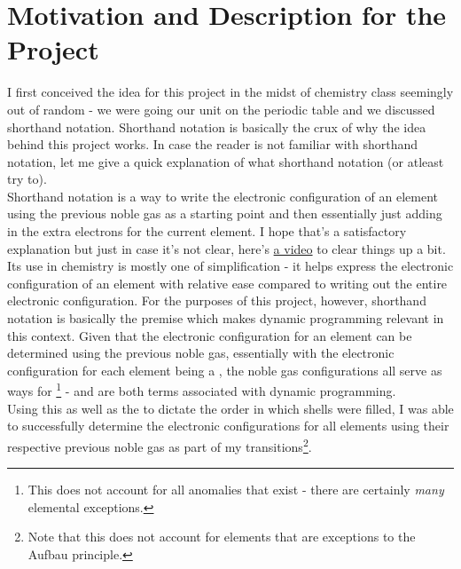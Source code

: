 
\section{Motivation and Description for the Project}

I first conceived the idea for this project in the midst of chemistry class seemingly out of random - we were going our unit on the periodic table and we discussed shorthand notation. Shorthand notation is basically the crux of why the idea behind this project works. In case the reader is not familiar with shorthand notation, let me give a quick explanation of what shorthand notation (or atleast try to). \\

Shorthand notation is a way to write the electronic configuration of an element using the previous noble gas as a starting point and then essentially just adding in the extra electrons for the current element. I hope that's a satisfactory explanation but just in case it's not clear, here's \href{https://www.youtube.com/watch?v=5mP0z1MAdCk}{a video} \cite{youtube_2020} to clear things up a bit. \\

Its use in chemistry is mostly one of simplification - it helps express the electronic configuration of an element with relative ease compared to writing out the entire electronic configuration. For the purposes of this project, however, shorthand notation is basically the premise which makes dynamic programming relevant in this context. Given that the electronic configuration for an element can be determined using the previous noble gas, essentially with the electronic configuration for each element being a , the noble gas configurations all serve as ways for \footnote{This does not account for all anomalies that exist - there are certainly \emph{many} elemental exceptions.} -  and  are both terms associated with dynamic programming. \\ 

Using this as well as the  to dictate the order in which shells were filled, I was able to successfully determine the electronic configurations for all elements using their respective previous noble gas as part of my transitions\footnote{Note that this does not account for elements that are exceptions to the Aufbau principle.}.